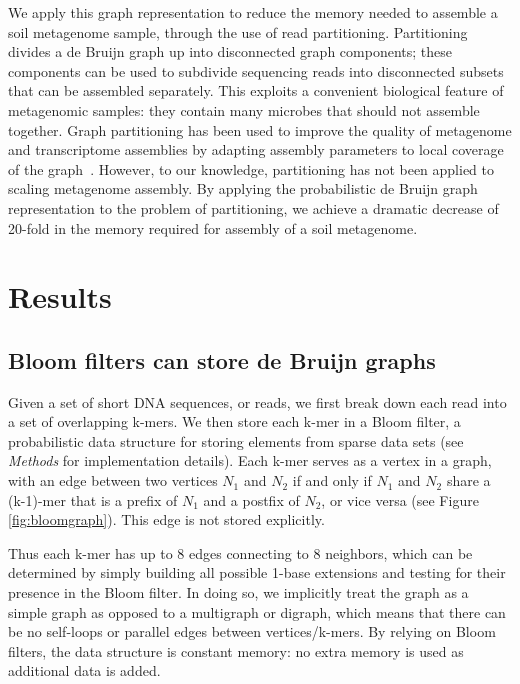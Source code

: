 \documentclass{pnastwo}
\begin{document}
\begin{article}
We apply this graph representation to reduce the memory needed
to assemble a soil metagenome sample, through
the use of read partitioning.  Partitioning divides a de Bruijn graph up
into disconnected graph components; these components can be used to
subdivide sequencing reads into disconnected subsets that can be
assembled separately.
This exploits a convenient biological
feature of metagenomic samples: they contain many microbes that should
not assemble together.  Graph partitioning has
been used to improve the quality of metagenome and transcriptome assemblies
by adapting assembly parameters to local coverage of the graph~\cite{metavelvet,pubmed21685107,trinity}.  However, to our knowledge, partitioning has not been applied
to scaling metagenome assembly. By applying the
probabilistic de Bruijn graph representation to the problem of
partitioning, we achieve a dramatic decrease of 20-fold in the memory
required for assembly of a soil metagenome.


\section{Results}

\subsection{Bloom filters can store de Bruijn graphs}

Given a set of short DNA sequences, or reads, we first break down each
read into a set of overlapping k-mers.  We then store each k-mer in a
Bloom filter, a probabilistic data structure for storing elements from sparse data
sets (see \emph{Methods} for implementation details).  Each k-mer
serves as a vertex in a graph, with an edge between two vertices $N_1$
and $N_2$ if and only if $N_1$ and $N_2$ share a (k-1)-mer that is a
prefix of $N_1$ and a postfix of $N_2$, or vice versa (see Figure
\ref{fig:bloomgraph}).  This edge is not stored explicitly.

Thus each k-mer has up to 8 edges connecting to 8 neighbors, which can be determined by
simply building all possible 1-base extensions and testing for their
presence in the Bloom filter.  In doing so, we implicitly treat the
graph as a simple graph as opposed to a multigraph or digraph, which
means that there can be no self-loops or parallel edges between
vertices/k-mers.  By relying on Bloom filters, the data structure is
constant memory: no extra memory is used as additional data is
added.


\end{article}
\end{document}
